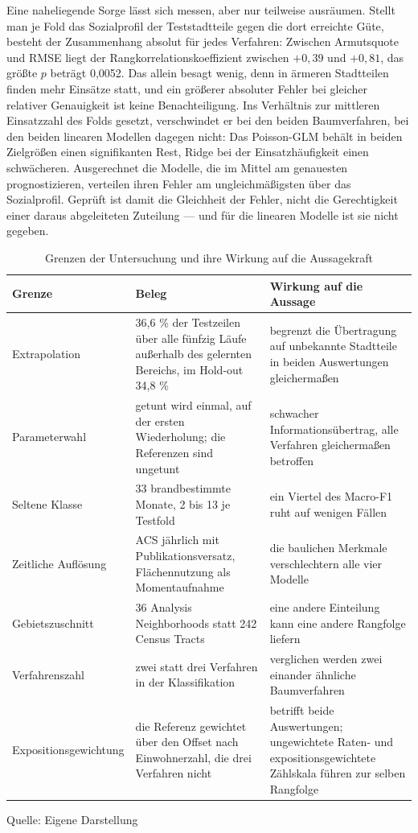 \documentclass[12pt,a4paper]{article}
\renewcommand{\footnotesize}{\fontsize{10pt}{12pt}\selectfont}
\newcommand{\tabformat}{%
  \centering
  \singlespacing
  \footnotesize
  \setlength{\tabcolsep}{5pt}%
  \renewcommand{\arraystretch}{1.15}%
}
\newcommand{\tabquelle}[1][Eigene Darstellung]{%
  \par\setlength{\parskip}{0pt}\vspace{3pt}%
  {\setstretch{1}\fontsize{9pt}{11pt}\selectfont\raggedright Quelle: #1\par}%
}
\begin{document}
Eine naheliegende Sorge lässt sich messen, aber nur teilweise ausräumen. Stellt
man je Fold das Sozialprofil der Teststadtteile gegen die dort erreichte Güte,
besteht der Zusammenhang absolut für jedes Verfahren: Zwischen Armutsquote und
RMSE liegt der Rangkorrelationskoeffizient zwischen $+0{,}39$ und $+0{,}81$, das
größte $p$ beträgt 0,0052. Das allein besagt wenig, denn in ärmeren Stadtteilen
finden mehr Einsätze statt, und ein größerer absoluter Fehler bei gleicher
relativer Genauigkeit ist keine Benachteiligung. Ins Verhältnis zur mittleren
Einsatzzahl des Folds gesetzt, verschwindet er bei den beiden Baumverfahren, bei
den beiden linearen Modellen dagegen nicht: Das Poisson-GLM behält in beiden
Zielgrößen einen signifikanten Rest, Ridge bei der Einsatzhäufigkeit einen
schwächeren. Ausgerechnet die Modelle, die im Mittel am genauesten
prognostizieren, verteilen ihren Fehler am ungleichmäßigsten über das
Sozialprofil. Geprüft ist damit die Gleichheit der Fehler, nicht die
Gerechtigkeit einer daraus abgeleiteten Zuteilung --- und für die linearen
Modelle ist sie nicht gegeben.

\begin{table}[htbp]
\tabformat
\caption{Grenzen der Untersuchung und ihre Wirkung auf die Aussagekraft}
\label{tab:limitationen}
\begin{tabularx}{\textwidth}{@{}L{2.6cm} L{4.8cm} Y@{}}
\toprule
\textbf{Grenze} & \textbf{Beleg} & \textbf{Wirkung auf die Aussage} \\
\midrule
Extrapolation & 36,6 \% der Testzeilen über alle fünfzig Läufe außerhalb des gelernten Bereichs, im Hold-out 34,8 \% & begrenzt die Übertragung auf unbekannte Stadtteile in beiden Auswertungen gleichermaßen \\
\addlinespace
Parameterwahl & getunt wird einmal, auf der ersten Wiederholung; die Referenzen sind ungetunt & schwacher Informationsübertrag, alle Verfahren gleichermaßen betroffen \\
\addlinespace
Seltene Klasse & 33 brandbestimmte Monate, 2 bis 13 je Testfold & ein Viertel des Macro-F1 ruht auf wenigen Fällen \\
\addlinespace
Zeitliche Auflösung & ACS jährlich mit Publikationsversatz, Flächennutzung als Momentaufnahme & die baulichen Merkmale verschlechtern alle vier Modelle \\
\addlinespace
Gebietszuschnitt & 36 Analysis Neighborhoods statt 242 Census Tracts & eine andere Einteilung kann eine andere Rangfolge liefern \\
\addlinespace
Verfahrenszahl & zwei statt drei Verfahren in der Klassifikation & verglichen werden zwei einander ähnliche Baumverfahren \\
\addlinespace
Expositions\-gewichtung & die Referenz gewichtet über den Offset nach Einwohnerzahl, die
drei Verfahren nicht & betrifft beide Auswertungen; ungewichtete Raten- und
expositionsgewichtete Zählskala führen zur selben Rangfolge \\
\bottomrule
\end{tabularx}
\tabquelle
\end{table}
\end{document}
